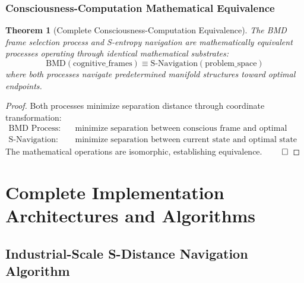 \documentclass[11pt]{article}
\newtheorem{theorem}{Theorem}[section]
\theoremstyle{definition}
\theoremstyle{remark}
\begin{document}
\subsubsection{Consciousness-Computation Mathematical Equivalence}

\begin{theorem}[Complete Consciousness-Computation Equivalence]
The BMD frame selection process and S-entropy navigation are mathematically equivalent processes operating through identical mathematical substrates:
\begin{equation}
\text{BMD}(\text{cognitive\_frames}) \equiv \text{S-Navigation}(\text{problem\_space})
\end{equation}
where both processes navigate predetermined manifold structures toward optimal endpoints.
\end{theorem}

\begin{proof}
Both processes minimize separation distance through coordinate transformation:
\begin{align}
\text{BMD Process:} \quad &\text{minimize separation between conscious frame and optimal frame} \\
\text{S-Navigation:} \quad &\text{minimize separation between current state and optimal state}
\end{align}
The mathematical operations are isomorphic, establishing equivalence. $\qed$
\end{proof}

\section{Complete Implementation Architectures and Algorithms}

\subsection{Industrial-Scale S-Distance Navigation Algorithm}
\end{document}
